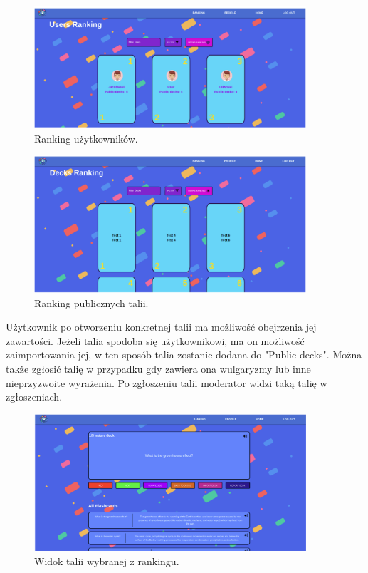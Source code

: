 \begin{figure}[H]
    \centering
    \includegraphics[width=0.9\textwidth]{chapters/chapter_10/images_web/web_user_ranking}
    \caption{Ranking użytkowników.}
    \label{img:web_user_ranking}
\end{figure}


\begin{figure}[H]
    \centering
    \includegraphics[width=0.9\textwidth]{chapters/chapter_10/images_web/web_decks_ranking}
    \caption{Ranking publicznych talii.}
    \label{img:web_decks_ranking}
\end{figure}


Użytkownik po otworzeniu konkretnej talii ma możliwość obejrzenia jej zawartości. Jeżeli talia spodoba się użytkownikowi, ma on możliwość zaimportowania jej, w ten sposób talia zostanie dodana do "Public decks". Można także zgłosić talię w przypadku gdy zawiera ona wulgaryzmy lub inne nieprzyzwoite wyrażenia. Po zgłoszeniu talii moderator widzi taką talię w zgłoszeniach.

\begin{figure}[H]
    \centering
    \includegraphics[width=0.9\textwidth]{chapters/chapter_10/images_web/web_public_deck}
    \caption{Widok talii wybranej z rankingu.}
    \label{img:web_public_deck}
\end{figure}


